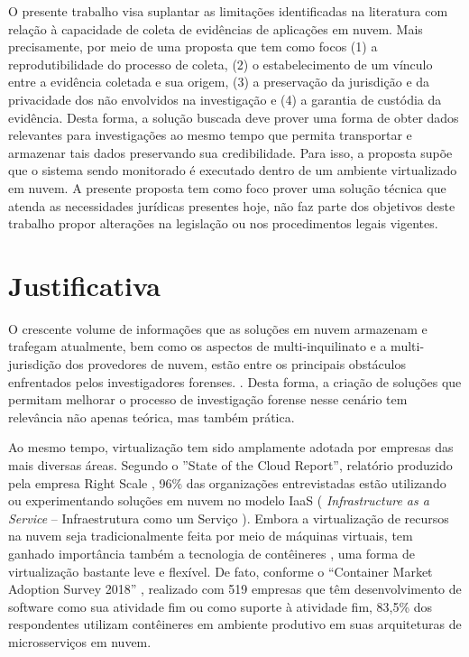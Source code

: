 %
O presente trabalho visa suplantar as limitações identificadas na literatura com relação à capacidade de coleta de evidências de aplicações em nuvem.
%
Mais precisamente, por meio de uma proposta que tem como focos (1) a reprodutibilidade do processo de coleta, (2) o estabelecimento de um vínculo entre a evidência coletada e sua origem, (3) a preservação da jurisdição e da privacidade dos não envolvidos na investigação e (4) a garantia de custódia da evidência.
%
Desta forma, a solução buscada deve prover uma forma de obter dados relevantes para investigações ao mesmo tempo que permita transportar e armazenar tais dados preservando sua credibilidade.
%
Para isso, a proposta supõe que o sistema sendo monitorado é executado dentro de um ambiente virtualizado em nuvem.
%
%
A presente proposta tem como foco prover uma solução técnica que atenda as necessidades jurídicas presentes hoje, não faz parte dos objetivos deste trabalho propor alterações na legislação ou nos procedimentos legais vigentes.


\section{Justificativa}
\label{sec:intro-justificativa}

O crescente volume de informações que as soluções em nuvem armazenam e trafegam atualmente, bem como os aspectos de multi-inquilinato e a multi-jurisdição dos provedores de nuvem, estão entre os principais obstáculos enfrentados pelos investigadores forenses. \cite{QuickIncreaseVolumeImpact:2014} \cite{BashAdvInForensics:2015}.
%
Desta forma, a criação de soluções que permitam melhorar o processo de investigação forense nesse cenário tem relevância não apenas teórica, mas também prática.


Ao mesmo tempo, virtualização tem sido amplamente adotada por empresas das mais diversas áreas. 
%
Segundo o ''State of the Cloud Report'', relatório produzido pela empresa Right Scale \cite{RightScale2018}, 96\% das organizações entrevistadas estão utilizando ou experimentando soluções em nuvem no modelo IaaS ( \textit{Infrastructure as a Service} -- Infraestrutura como um Serviço ).
%
Embora a virtualização de recursos na nuvem seja tradicionalmente feita por meio de máquinas virtuais, tem ganhado importância também a tecnologia de contêineres \cite{Diamanti2019}, uma forma de virtualização bastante leve e flexível.
%
De fato, conforme o ``Container Market Adoption Survey 2018'' \cite{Portworx2018}, realizado com 519 empresas que têm desenvolvimento de software como sua atividade fim ou como suporte à atividade fim, 83,5\% dos respondentes utilizam contêineres em ambiente produtivo em suas arquiteturas de microsserviços em nuvem.
%

